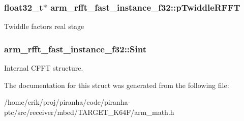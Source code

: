 \subsubsection[{\texorpdfstring{p\+Twiddle\+R\+F\+FT}{pTwiddleRFFT}}]{\setlength{\rightskip}{0pt plus 5cm}float32\+\_\+t$\ast$ arm\+\_\+rfft\+\_\+fast\+\_\+instance\+\_\+f32\+::p\+Twiddle\+R\+F\+FT}\hypertarget{structarm__rfft__fast__instance__f32_a9f30b04f163fabc1b24421d3c323d5fc}{}\label{structarm__rfft__fast__instance__f32_a9f30b04f163fabc1b24421d3c323d5fc}
Twiddle factors real stage 
\subsubsection[{\texorpdfstring{Sint}{Sint}}]{ arm\+\_\+rfft\+\_\+fast\+\_\+instance\+\_\+f32\+::\+Sint}\hypertarget{structarm__rfft__fast__instance__f32_a37419ababdfb3151b1891ae6bcd21012}{}\label{structarm__rfft__fast__instance__f32_a37419ababdfb3151b1891ae6bcd21012}
Internal C\+F\+FT structure. 

The documentation for this struct was generated from the following file\+:\begin{DoxyCompactItemize}
\item 
/home/erik/proj/piranha/code/piranha-\/ptc/src/receiver/mbed/\+T\+A\+R\+G\+E\+T\+\_\+\+K64\+F/arm\+\_\+math.\+h\end{DoxyCompactItemize}
